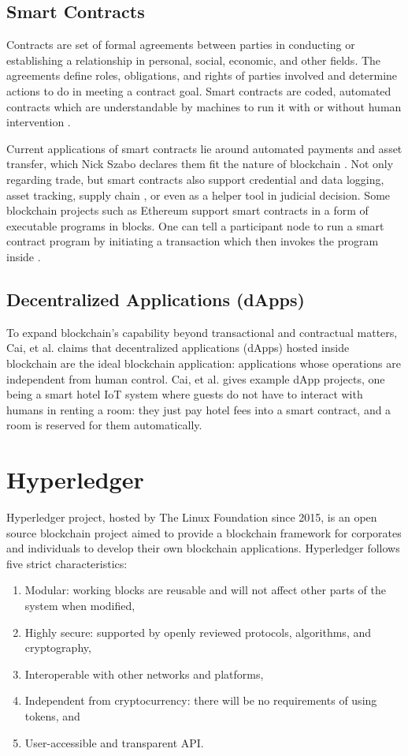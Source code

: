 \documentclass[a4paper,12pt,oneside, utf8x]{report}
\begin{document}
\subsection{Smart Contracts}

Contracts are set of formal agreements between parties in conducting or establishing a relationship in personal, social, economic, and other fields. The agreements define roles, obligations, and rights of parties involved and determine actions to do in meeting a contract goal. Smart contracts are coded, automated contracts which are understandable by machines to run it with or without human intervention \cite{a22}.

Current applications of smart contracts lie around automated payments and asset transfer, which Nick Szabo declares them fit the nature of blockchain \cite{a23}. Not only regarding trade, but smart contracts also support credential and data logging, asset tracking, supply chain \cite{a23}, or even as a helper tool in judicial decision. Some blockchain projects such as Ethereum support smart contracts in a form of executable programs in blocks. One can tell a participant node to run a smart contract program by initiating a transaction which then invokes the program inside \cite{a24}.

\subsection{Decentralized Applications (dApps)}
To expand blockchain’s capability beyond transactional and contractual matters, Cai, et al. \cite{a24} claims that decentralized applications (dApps) hosted inside blockchain are the ideal blockchain application: applications whose operations are independent from human control. Cai, et al. gives example dApp projects, one being a smart hotel IoT system where guests do not have to interact with humans in renting a room: they just pay hotel fees into a smart contract, and a room is reserved for them automatically.

\section{Hyperledger \cite{a25}}
Hyperledger project, hosted by The Linux Foundation since 2015, is an open source blockchain project aimed to provide a blockchain framework for corporates and individuals to develop their own blockchain applications. Hyperledger follows five strict characteristics:
\begin{enumerate}
\item Modular: working blocks are reusable and will not affect other parts of the system when modified,
\item Highly secure: supported by openly reviewed protocols, algorithms, and cryptography,
\item Interoperable with other networks and platforms,
\item Independent from cryptocurrency: there will be no requirements of using tokens, and
\item User-accessible and transparent API.
\end{enumerate}
\end{document}
